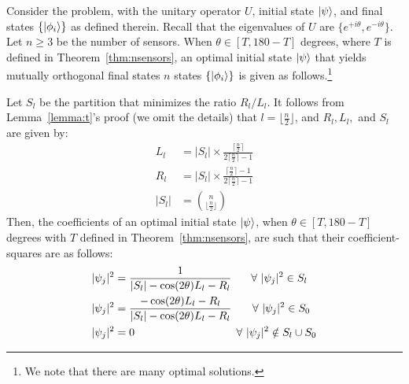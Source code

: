 \begin{cor-prf}
\label{cor:orthogonal-opt}
Consider the \iso problem, with the unitary operator $U$, initial state $\ket{\psi}$,
and final states $\{\ket{\phi_i}\}$ as defined therein. Recall that the eigenvalues of
$U$ are $\{e^{+i\theta}, e^{-i\theta}\}$. Let $n \geq 3$ be the number of sensors.
When $\theta \in [T, 180-T]$ degrees, where $T$ is defined in Theorem~\ref{thm:nsensors}, an 
optimal initial state $\ket{\psi}$ that yields
mutually orthogonal final states $n$ states $\{\ket{\phi_i}\}$ is given as follows.\footnote{We note that there are many optimal solutions.}

Let $S_l$ be the partition that minimizes the ratio $R_l/L_l$. It follows from Lemma~\ref{lemma:t}'s proof (we omit the details) that $l = \lfloor \frac{n}{2} \rfloor$, and $R_l, L_l,$ and $S_l$ are given by:
\begin{align*}
L_l &= |S_l| \times \frac{\lceil \frac{n}{2} \rceil}{2\lceil \frac{n}{2} \rceil-1}\\
R_l &= |S_l| \times \frac{\lceil \frac{n}{2} \rceil - 1}{2\lceil \frac{n}{2} \rceil-1} \\
|S_l| &= {n \choose \lfloor \frac{n}{2} \rfloor  }
\end{align*}
Then, the coefficients of an optimal initial state $\ket{\psi}$, 
when $\theta \in [T, 180-T]$ degrees with $T$ defined in Theorem~\ref{thm:nsensors}, 
are such that their coefficient-squares are as follows:
\begin{align*}
|\psi_j|^{2} &= \frac{1}{|S_l| - \cos(2\theta) L_l - R_l} \ \hspace{0.2in} \forall\ |\psi_j|^{2} \in S_l  \\
|\psi_j|^{2} &= \frac{-\cos(2\theta)L_l - R_l}{|S_l| - \cos(2\theta) L_l - R_l}   \ \hspace{0.17in}   \ \forall\ |\psi_j|^{2} \in {S_0} \\
|\psi_j|^{2} &= 0\ \hspace{1.19in}   \ \forall\ |\psi_j|^{2} \notin {S_l \cup S_0}
\end{align*}
\label{thm:optimal-largerT}
\end{cor-prf}

